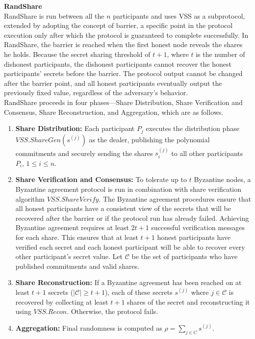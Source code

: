 \documentclass[letterpaper,twocolumn,10pt]{article}
\theoremstyle{definition}
\theoremstyle{remark}
\begin{document}
\textbf{RandShare}\\

RandShare is run between all the $n$ participants and uses VSS as a subprotocol, extended by adopting the concept of barrier, a specific point in the protocol execution only after which the protocol is guaranteed to complete successfully. In RandShare, the barrier is reached when the first honest node reveals the shares he holds. Because the secret sharing threshold of $t + 1$, where $t$ is the number of dishonest participants, the dishonest participants cannot recover the honest participants’ secrets before the barrier. The protocol output cannot be changed after the barrier point, and all honest participants eventually output the previously fixed value, regardless of the adversary’s behavior.\\
RandShare proceeds in four phases---Share Distribution, Share Verification and Consensus, Share Reconstruction, and Aggregation, which are as follows.

\begin{enumerate}
    \item \textbf{Share Distribution:} Each participant $P_j$ executes the distribution phase $VSS.ShareGen(s^{(j)})$ as the dealer, publishing the polynomial commitments and securely sending the shares $s_i^{(j)}$ to all other participants $P_i$, $1\le i\le n$.
    \item \textbf{Share Verification and Consensus:} To tolerate up to $t$ Byzantine nodes, a Byzantine agreement protocol is run in combination with share verification algorithm $VSS.ShareVerify$. The Byzantine agreement procedures ensure that all honest participants have a consistent view of the secrets that will be recovered after the barrier or if the protocol run has already failed. Achieving Byzantine agreement requires at least $2t+1$ successful verification messages for each share. This ensures that at least $t+1$ honest participants have verified each secret and each honest participant will be able to recover every other participant’s secret value. Let $\mathcal{C}$ be the set of participants who have published commitments and valid shares. 
    \item \textbf{Share Reconstruction:} If a Byzantine agreement has been reached on at least $t+1$ secrets ($|\mathcal{C}| \ge t+1$), each of these secrets $s^{(j)}$ where $j \in \mathcal{C}$ is recovered by collecting at least $t+1$ shares of the secret and reconstructing it using $VSS.Recon$. Otherwise, the protocol fails.
    \item \textbf{Aggregation:} Final randomness is computed as $\rho = \sum_{j \in C}s^{(j)}$.
    
\end{enumerate}
\end{document}
